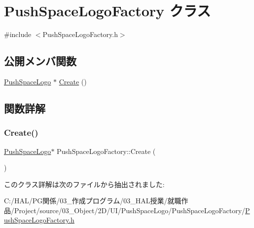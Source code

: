 \hypertarget{class_push_space_logo_factory}{}\section{Push\+Space\+Logo\+Factory クラス}
\label{class_push_space_logo_factory}


{\ttfamily \#include $<$Push\+Space\+Logo\+Factory.\+h$>$}

\subsection*{公開メンバ関数}
\begin{DoxyCompactItemize}
\item 
\mbox{\hyperlink{class_push_space_logo}{Push\+Space\+Logo}} $\ast$ \mbox{\hyperlink{class_push_space_logo_factory_a40ed4a7781d8f5a6e802b90f3aa599cb}{Create}} ()
\end{DoxyCompactItemize}


\subsection{関数詳解}
\mbox{\label{class_push_space_logo_factory_a40ed4a7781d8f5a6e802b90f3aa599cb}} 
\subsubsection{\texorpdfstring{Create()}{Create()}}
{\footnotesize\ttfamily \mbox{\hyperlink{class_push_space_logo}{Push\+Space\+Logo}}$\ast$ Push\+Space\+Logo\+Factory\+::\+Create (\begin{DoxyParamCaption}{ }\end{DoxyParamCaption})\hspace{0.3cm}{\ttfamily [inline]}}



このクラス詳解は次のファイルから抽出されました\+:\begin{DoxyCompactItemize}
\item 
C\+:/\+H\+A\+L/\+P\+G関係/03\+\_\+作成プログラム/03\+\_\+\+H\+A\+L授業/就職作品/\+Project/source/03\+\_\+\+Object/2\+D/\+U\+I/\+Push\+Space\+Logo/\+Push\+Space\+Logo\+Factory/\mbox{\hyperlink{_push_space_logo_factory_8h}{Push\+Space\+Logo\+Factory.\+h}}\end{DoxyCompactItemize}
